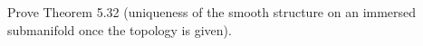 Prove Theorem 5.32 (uniqueness of the smooth structure on an immersed submanifold once the topology is given).